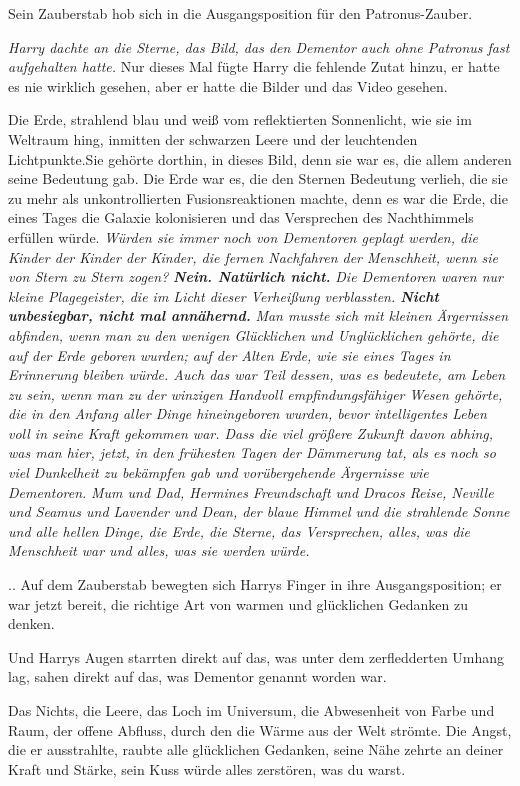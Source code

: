 Sein Zauberstab hob sich in die Ausgangsposition für den Patronus-Zauber.

\emph{Harry dachte an die Sterne, das Bild, das den Dementor auch ohne Patronus
fast aufgehalten hatte.} Nur dieses Mal fügte Harry die fehlende Zutat hinzu, er
hatte es nie wirklich gesehen, aber er hatte die Bilder und das Video gesehen.

Die Erde, strahlend blau und weiß vom reflektierten Sonnenlicht, wie sie im
Weltraum hing, inmitten der schwarzen Leere und der leuchtenden Lichtpunkte.Sie
gehörte dorthin, in dieses Bild, denn sie war es, die allem anderen seine
Bedeutung gab. Die Erde war es, die den Sternen Bedeutung verlieh, die sie zu
mehr als unkontrollierten Fusionsreaktionen machte, denn es war die Erde, die
eines Tages die Galaxie kolonisieren und das Versprechen des Nachthimmels
erfüllen würde. \emph{ Würden sie immer noch von Dementoren geplagt werden, die
Kinder der Kinder der Kinder, die fernen Nachfahren der Menschheit, wenn sie von
Stern zu Stern zogen?} \emph{\textbf{Nein. Natürlich nicht.} } \emph{Die
Dementoren waren nur kleine Plagegeister, die im Licht dieser Verheißung
verblassten. \textbf{Nicht unbesiegbar, nicht mal annähernd.}} \emph{Man musste
sich mit kleinen Ärgernissen abfinden, wenn man zu den wenigen Glücklichen und
Unglücklichen gehörte, die auf der Erde geboren wurden; auf der Alten Erde, wie
sie eines Tages in Erinnerung bleiben würde. Auch das war Teil dessen, was es
bedeutete, am Leben zu sein, wenn man zu der winzigen Handvoll
empfindungsfähiger Wesen gehörte, die in den Anfang aller Dinge hineingeboren
wurden, bevor intelligentes Leben voll in seine Kraft gekommen war. Dass die
viel größere Zukunft davon abhing, was man hier, jetzt, in den frühesten Tagen
der Dämmerung tat, als es noch so viel Dunkelheit zu bekämpfen gab und
vorübergehende Ärgernisse wie Dementoren.} \emph{ Mum und Dad, Hermines
Freundschaft und Dracos Reise, Neville und Seamus und Lavender und Dean, der
blaue Himmel und die strahlende Sonne und alle hellen Dinge, die Erde, die
Sterne, das Versprechen, alles, was die Menschheit war und alles, was sie werden
würde.}

.. Auf dem Zauberstab bewegten sich Harrys Finger in ihre Ausgangsposition; er
war jetzt bereit, die richtige Art von warmen und glücklichen Gedanken zu
denken.

Und Harrys Augen starrten direkt auf das, was unter dem zerfledderten Umhang
lag, sahen direkt auf das, was Dementor genannt worden war.

Das Nichts, die Leere, das Loch im Universum, die Abwesenheit von Farbe und
Raum, der offene Abfluss, durch den die Wärme aus der Welt strömte. Die Angst,
die er ausstrahlte, raubte alle glücklichen Gedanken, seine Nähe zehrte an
deiner Kraft und Stärke, sein Kuss würde alles zerstören, was du warst.

